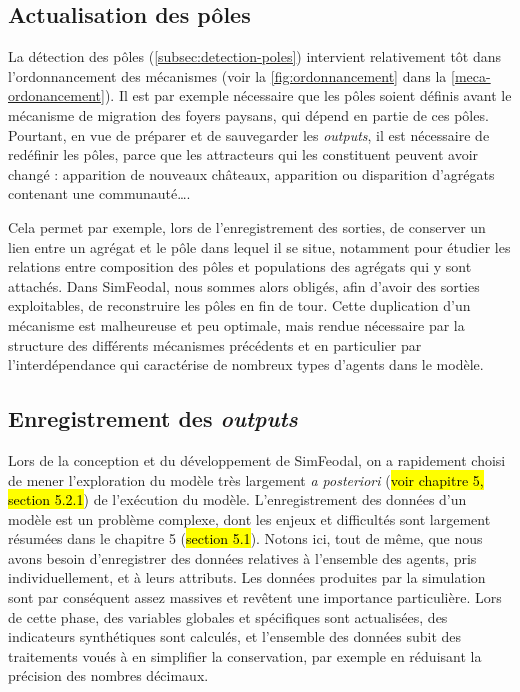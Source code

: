 \subsection{Actualisation des pôles}

\begin{tcolorbox}[breakable,left=0pt,right=0pt,top=0pt,bottom=0pt,
	colback=gray!15,colframe=gray!15,width=\dimexpr\textwidth\relax, 
	enlarge left by=0mm, boxsep=5pt,arc=0pt,outer arc=0pt]
La détection des pôles (\cref{subsec:detection-poles}) intervient relativement tôt dans l'ordonnancement des mécanismes (voir la \cref{fig:ordonnancement} dans la \cref{meca-ordonancement}).
Il est par exemple nécessaire que les pôles soient définis avant le mécanisme de migration des foyers paysans, qui dépend en partie de ces pôles.
Pourtant, en vue de préparer et de sauvegarder les \textit{outputs}, il est nécessaire de redéfinir les pôles, parce que les attracteurs qui les constituent peuvent avoir changé : apparition de nouveaux châteaux, apparition ou disparition d'agrégats contenant une communauté\ldots.

Cela permet par exemple, lors de l'enregistrement des sorties, de conserver un lien entre un agrégat et le pôle dans lequel il se situe, notamment pour étudier les relations entre composition des pôles et populations des agrégats qui y sont attachés.
Dans SimFeodal, nous sommes alors obligés, afin d'avoir des sorties exploitables, de reconstruire les pôles en fin de tour.
Cette duplication d'un mécanisme est malheureuse et peu optimale, mais rendue nécessaire par la structure des différents mécanismes précédents et en particulier par l'interdépendance qui caractérise de nombreux types d'agents dans le modèle.
\end{tcolorbox}


\subsection{Enregistrement des \textit{outputs} \label{meca-outputs}}

\begin{tcolorbox}[breakable,left=0pt,right=0pt,top=0pt,bottom=0pt,
	colback=gray!15,colframe=gray!15,width=\dimexpr\textwidth\relax, 
	enlarge left by=0mm, boxsep=5pt,arc=0pt,outer arc=0pt]
Lors de la conception et du développement de SimFeodal, on a rapidement choisi de mener l'exploration du modèle très largement \textit{a posteriori} (\hl{voir chapitre 5, section 5.2.1}) de l'exécution du modèle.
L'enregistrement des données d'un modèle est un problème complexe, dont les enjeux et difficultés sont largement résumées dans le chapitre 5 (\hl{section 5.1}).
Notons ici, tout de même, que nous avons besoin d'enregistrer des données relatives à l'ensemble des agents, pris individuellement, et à leurs attributs.
Les données produites par la simulation sont par conséquent assez massives et revêtent une importance particulière.
Lors de cette phase, des variables globales et spécifiques sont actualisées, des indicateurs synthétiques sont calculés, et l'ensemble des données subit des traitements voués à en simplifier la conservation, par exemple en réduisant la précision des nombres décimaux\footnotemark.
\end{tcolorbox}

